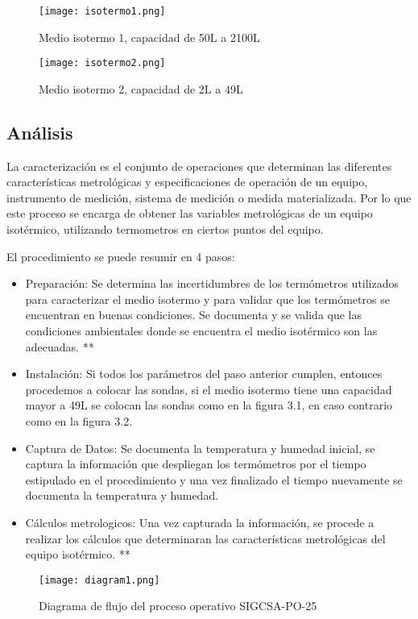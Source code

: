 \begin{figure}[H]
	\centering
	\texttt{[image: isotermo1.png]}
	\caption{Medio isotermo 1, capacidad de 50L a 2100L}
\end{figure}

\begin{figure}[H]
	\centering
	\texttt{[image: isotermo2.png]}
	\caption{Medio isotermo 2, capacidad de 2L a 49L}
\end{figure}
	
\subsection{Análisis}
\par 
La caracterización es el conjunto de operaciones que determinan las diferentes
características metrológicas y especificaciones de operación de un
equipo, instrumento de medición, sistema de medición o medida
materializada. Por lo que este proceso se encarga de obtener las variables metrológicas de un equipo isotérmico, utilizando termometros en ciertos puntos del equipo. 

\par \noindent
El procedimiento se puede resumir en 4 pasos:

\begin{itemize}
	\item Preparación: Se determina las incertidumbres de los termómetros utilizados para caracterizar el medio isotermo y para validar que los termómetros se encuentran en buenas condiciones. Se documenta y se valida que las condiciones ambientales donde se encuentra el medio isotérmico son las adecuadas. **
	
	\item Instalación: Si todos los parámetros del paso anterior cumplen, entonces procedemos a colocar las sondas, si el medio isotermo tiene una capacidad mayor a 49L se colocan las sondas como en la figura 3.1, en caso contrario como en la figura 3.2.
	
	\item Captura de Datos: Se documenta la temperatura y humedad inicial, se captura la información que despliegan los termómetros por el tiempo estipulado en el procedimiento y una vez finalizado el tiempo nuevamente se documenta la temperatura y humedad.
	
	\item Cálculos metrologicos: Una vez capturada la información, se procede a realizar los cálculos que determinaran las características metrológicas del equipo isotérmico. ** 
\end{itemize}

\begin{figure}[H]
	\centering
	\texttt{[image: diagram1.png]}
	\caption{Diagrama de flujo del proceso operativo SIGCSA-PO-25}
\end{figure}